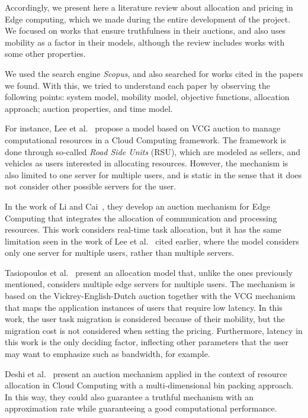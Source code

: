 \documentclass[English]{ic-tese-v3}
\begin{document}
Accordingly, we present here a literature review about allocation and pricing in Edge computing, which we made during the entire development of the project. We focused on works that ensure truthfulness in their auctions, and also uses mobility as a factor in their models, although the review includes works with some other properties.

We used the search engine \emph{Scopus}, and also searched for works cited in the papers we found. With this, we tried to understand each paper by observing the following points: system model, mobility model, objective functions, allocation approach; auction properties, and time model. 

For instance, Lee et al.~\cite{LeeBlockchain2020} propose a model based on VCG auction to manage computational resources in a Cloud Computing framework. The framework is done through so-called \emph{Road Side Units} (RSU), which are modeled as sellers, and vehicles as users interested in allocating resources. However, the mechanism is also limited to one server for multiple users, and is static in the sense that it does not consider other possible servers for the user.

In the work of Li and Cai~\cite{Li2020Online}, they develop an auction mechanism for Edge Computing that integrates the allocation of communication and processing resources. This work considers real-time task allocation, but it has the same limitation seen in the work of Lee et al.~\cite{LeeBlockchain2020} cited earlier, where the model considers only one server for multiple users, rather than multiple servers.

Tasiopoulos et al.~\cite{TasiEdgeMAP2018} present an allocation model that, unlike the ones previously mentioned, considers multiple edge servers for multiple users. The mechanism is based on the Vickrey-English-Dutch auction together with the VCG mechanism that maps the application instances of users that require low latency. In this work, the user task migration is considered because of their mobility, but the migration cost is not considered when setting the pricing. Furthermore, latency in this work is the only deciding factor, inflecting other parameters that the user may want to emphasize such as bandwidth, for example.

Deshi et al.~\cite{DeshiTruthful2020} present an auction mechanism applied in the context of resource allocation in Cloud Computing with a multi-dimensional bin packing approach. In this way, they could also guarantee a truthful mechanism with an approximation rate while guaranteeing a good computational performance.
\end{document}
